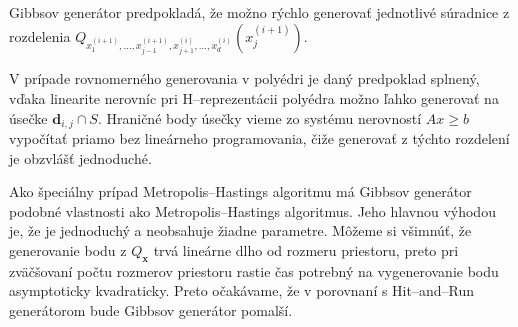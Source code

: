 Gibbsov generátor predpokladá, že možno rýchlo generovať jednotlivé súradnice z rozdelenia $Q_{x^{(i+1)}_1, \dots, x^{(i+1)}_{j-1}, x^{(i)}_{j+1}, \dots, x^{(i)}_d}(x^{(i+1)}_j)$.

V prípade rovnomerného generovania v polyédri je daný predpoklad splnený, vďaka linearite nerovníc pri H--reprezentácii polyédra možno ľahko generovať na úsečke $\mathbf d_{i,j} \cap S$. Hraničné body úsečky vieme zo systému nerovností $Ax \geq b$ vypočítať priamo bez lineárneho programovania, čiže generovať z týchto rozdelení je obzvlášť jednoduché.

Ako špeciálny prípad Metropolis--Hastings algoritmu má Gibbsov generátor podobné vlastnosti ako Metropolis--Hastings algoritmus. Jeho hlavnou výhodou je, že je jednoduchý a neobsahuje žiadne parametre. Môžeme si všimnúť, že generovanie bodu z $Q_{\mathbf x}$ trvá lineárne dlho od rozmeru priestoru, preto pri zväčšovaní počtu rozmerov priestoru rastie čas potrebný na vygenerovanie bodu asymptoticky kvadraticky. Preto očakávame, že v porovnaní s Hit--and--Run generátorom bude Gibbsov generátor pomalší.
